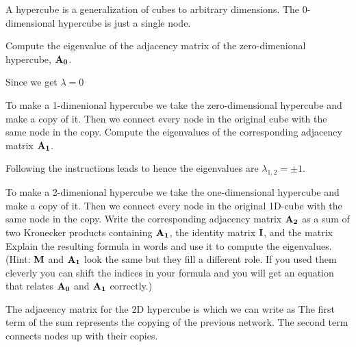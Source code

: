 
A hypercube is a generalization of cubes to arbitrary dimensions. The 0-dimensional hypercube is just a single  node. 

\subquestion
Compute the eigenvalue of the adjacency matrix of the zero-dimenional hypercube, ${\bf A_0}$.

\solution
Since 
we get $\lambda=0$

\subquestion
To make a 1-dimenional hypercube we take the zero-dimensional hypercube and make a copy of it. Then we connect every node in the original cube with the same node in the copy. Compute the eigenvalues of the corresponding adjacency matrix ${\bf A_1}$. 

\solution
Following the instructions leads to 
hence the eigenvalues are $\lambda_{1,2}=\pm 1$.

\subquestion
To make a 2-dimenional hypercube we take the one-dimensional hypercube and make a copy of it. Then we connect every node in the original 1D-cube with the same node in the copy. Write the corresponding adjacency matrix $\bf A_2$ as a sum  of two Kronecker products containing $\bf A_1$, the identity matrix $\bf I$, and the matrix
Explain the resulting formula in words and use it to compute the eigenvalues. 
(Hint: $\bf M$ and $\bf A_1$ look the same but they fill a different role. If you used them cleverly you can shift the indices in your formula and you will get an equation that relates $\bf A_0$ and $\bf A_1$ correctly.)

\solution
The adjacency matrix for the 2D hypercube is 
which we can write as 
The first term of the sum represents the copying of the previous network. The second term connects nodes up with their copies.

